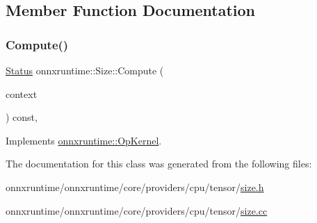 \subsection{Member Function Documentation}
\mbox{\label{classonnxruntime_1_1Size_ae622eb20d1b354af665deca538f0052a}} 
\subsubsection{\texorpdfstring{Compute()}{Compute()}}
{\footnotesize\ttfamily \mbox{\hyperlink{classonnxruntime_1_1common_1_1Status}{Status}} onnxruntime\+::\+Size\+::\+Compute (\begin{DoxyParamCaption}\item[{\mbox{\hyperlink{classonnxruntime_1_1OpKernelContext}{Op\+Kernel\+Context}} $\ast$}]{context }\end{DoxyParamCaption}) const\hspace{0.3cm}{\ttfamily [override]}, {\ttfamily [virtual]}}



Implements \mbox{\hyperlink{classonnxruntime_1_1OpKernel_a9eca8656a78b1b3ab9d3351a12798650}{onnxruntime\+::\+Op\+Kernel}}.



The documentation for this class was generated from the following files\+:\begin{DoxyCompactItemize}
\item 
onnxruntime/onnxruntime/core/providers/cpu/tensor/\mbox{\hyperlink{size_8h}{size.\+h}}\item 
onnxruntime/onnxruntime/core/providers/cpu/tensor/\mbox{\hyperlink{size_8cc}{size.\+cc}}\end{DoxyCompactItemize}
